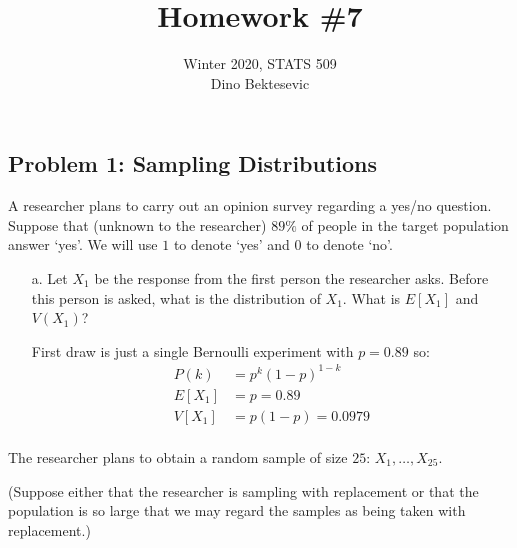 \documentclass{article}
\date{{}}
\newcommand{\1}{\mathbf{1}}
\begin{document}
\title{Homework \#7}
\author{\normalsize{Winter 2020, STATS 509}\\
\normalsize{Dino Bektesevic}}
\maketitle

\subsection*{Problem 1: Sampling Distributions}

A researcher plans to carry out an opinion survey regarding a yes/no question. Suppose that (unknown to the researcher) $89\%$ of people in the target population answer `yes'. We will use $1$ to denote `yes' and $0$ to denote `no'.

\begin{itemize}
    \item[a.] Let $X_1$ be the response from the first person the researcher asks. Before this person is asked, what is the distribution of $X_1$. What is $E[X_1]$ and $V(X_1)$?
    
    First draw is just a single Bernoulli experiment with $p=0.89$ so:
    \begin{align*}
        P(k) &= p^k(1-p)^{1-k} \\
        E[X_1] &= p = 0.89\\
        V[X_1] &= p(1-p) = 0.0979\\
    \end{align*}
\end{itemize}

The researcher plans to obtain a random sample of size $25$: $X_1,\ldots , X_{25}$. \par
(Suppose either that the researcher is sampling with replacement or that the population is so large that we may regard the samples as being taken with replacement.)
\end{document}
